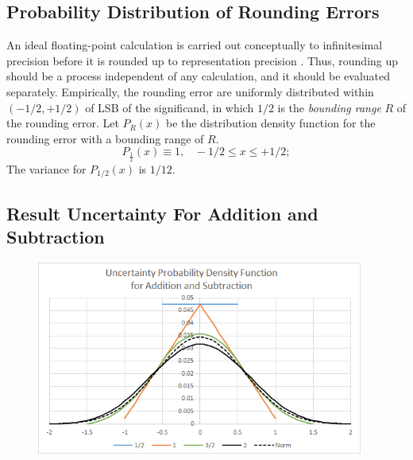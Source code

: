 \documentclass[twoside]{article}
\numberwithin{equation}{section}
\newcommand{\eqspace}{\;\;\;}
\begin{document}
\subsection{Probability Distribution of Rounding Errors \cite{Prev_Precision_Arithmetic}}

An ideal floating-point calculation is carried out conceptually to infinitesimal precision before it is rounded up to representation precision \cite{Floating_Point_Arithmetic}. 
Thus, rounding up should be a process independent of any calculation, and it should be evaluated separately.
Empirically, the rounding error are uniformly distributed within $(-1/2, +1/2)$ of LSB of the significand, in which $1/2$ is the \emph{bounding range} $R$ of the rounding error.
Let $P_R(x)$ be the distribution density function for the rounding error with a bounding range of $R$.
\begin{equation}
\label{eqn: rounding error 1/2 distribution}
P_{\frac{1}{2}}(x) \equiv 1, \eqspace  -1/2 \leq x \leq +1/2; 
\end{equation}
The variance for $P_{1/2}(x)$ is $1/12$.



\subsection{Result Uncertainty For Addition and Subtraction  \cite{Prev_Precision_Arithmetic}}

\begin{figure}[p]
\centering
\includegraphics[height=2.5in]{Prec_Add_ErrDist.png} 
\label{fig: Prec_Add_Err_Dist}
\end{figure}
\end{document}
